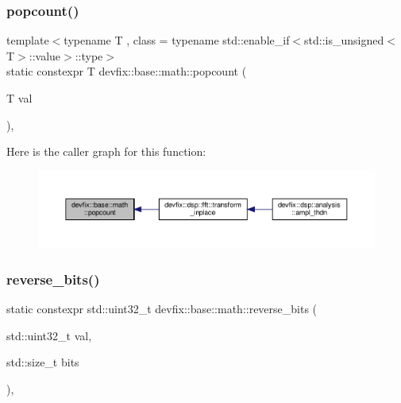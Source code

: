 \subsubsection{\texorpdfstring{popcount()}{popcount()}}
{\footnotesize\ttfamily template$<$typename T , class  = typename std\+::enable\+\_\+if$<$std\+::is\+\_\+unsigned$<$\+T$>$\+::value$>$\+::type$>$ \\
static constexpr T devfix\+::base\+::math\+::popcount (\begin{DoxyParamCaption}\item[{T}]{val }\end{DoxyParamCaption})\hspace{0.3cm}{\ttfamily [inline]}, {\ttfamily [static]}}

Here is the caller graph for this function\+:\nopagebreak
\begin{figure}[H]
\begin{center}
\leavevmode
\includegraphics[width=350pt]{structdevfix_1_1base_1_1math_a43815037f45e01d90a6c0cb0e1d8ef11_icgraph}
\end{center}
\end{figure}
\mbox{\label{structdevfix_1_1base_1_1math_af3260ac1a62b3e9f6feb0f212aa8f796}} 
\subsubsection{\texorpdfstring{reverse\+\_\+bits()}{reverse\_bits()}}
{\footnotesize\ttfamily static constexpr std\+::uint32\+\_\+t devfix\+::base\+::math\+::reverse\+\_\+bits (\begin{DoxyParamCaption}\item[{std\+::uint32\+\_\+t}]{val,  }\item[{std\+::size\+\_\+t}]{bits }\end{DoxyParamCaption})\hspace{0.3cm}{\ttfamily [inline]}, {\ttfamily [static]}}

